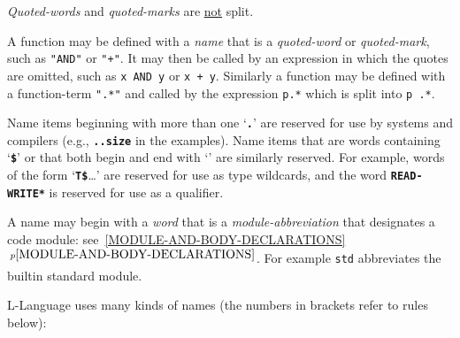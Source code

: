 \documentclass[12pt]{article}
\newcommand{\TT}[1]{{\tt \bfseries #1}}
\newcommand{\itemref}[1]{\ref{#1}$\,^{p\pageref{#1}}$}
\begin{document}
{\em Quoted-words} and {\em quoted-marks} are \underline{not} split.

A function may be defined with a {\em name} that is a {\em quoted-word}
or {\em quoted-mark},
such as {\tt "AND"} or {\tt "+"}.
It may then be called by an expression in which the
quotes are omitted, such as {\tt x AND y} or {\tt x + y}.
Similarly a function may be
defined with a function-term {\tt ".*"} and called by the expression
{\tt p.*} which is split into {\tt p .*}.


Name items beginning with more than one `\TT{.}' are reserved
for use by systems and compilers (e.g., \TT{..size} in the examples).
Name items that are words containing `\TT{\$}' or that both
begin and end with `\TT{*}' are
similarly reserved.  For example, words of the form `\TT{T\$}\ldots'
are reserved for use as type wildcards, and the word \TT{*READ-WRITE*}
is reserved for use as a qualifier.

A name may begin with a {\em word} that is a {\em module-abbreviation}
that designates a code module: see~\itemref{MODULE-AND-BODY-DECLARATIONS}.
For example {\tt std} abbreviates the builtin standard module.

L-Language uses many kinds of names (the numbers in brackets refer to
rules below):
\end{document}
